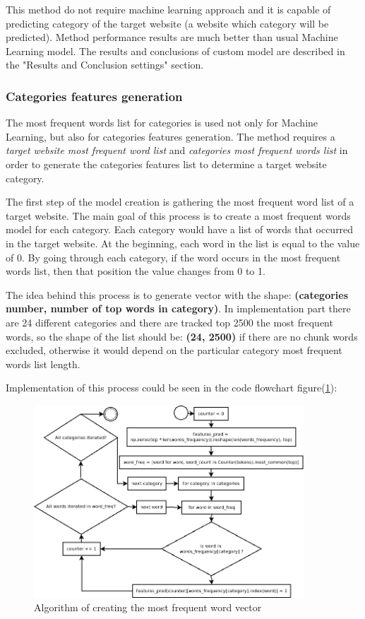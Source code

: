 This method do not require machine learning approach and it is capable of predicting category of the target website (a website which category will be predicted). Method performance results are much better than usual Machine Learning model. The results and conclusions of custom model are described in the "Results and Conclusion settings" section.

\subsubsection{Categories features generation}

The most frequent words list for categories is used not only for Machine Learning, but also for categories features generation. The method requires a \textit{target website most frequent word list} and \textit{categories most frequent words list} in order to generate the categories features list to determine a target website category. 


The first step of the model creation is gathering the most frequent word list of a target website. The main goal of this process is to create a most frequent words model for each category. Each category would have a list of words that occurred in the target website. At the beginning, each word in the list is equal to the value of 0. By going through each category, if the word occurs in the most frequent words list, then that position the value changes from 0 to 1.

The idea behind this process is to generate vector with the shape: \textbf{(categories number, number of top words in category)}. In implementation part there are  24 different categories and there are tracked top 2500 the most frequent words, so the shape of the list should be: \textbf{(24, 2500)} if there are no chunk words excluded, otherwise it would depend on the particular category most frequent words list length. 

Implementation of this process could be seen in the code flowchart figure(\ref{fig:category_features}):
\begin{figure}[H]
    \centering
    \includegraphics[width=0.9\textwidth]{Pictures/category_features.png}
    \caption{\label{fig:category_features}{}Algorithm of creating the most frequent word vector }
\end{figure}

